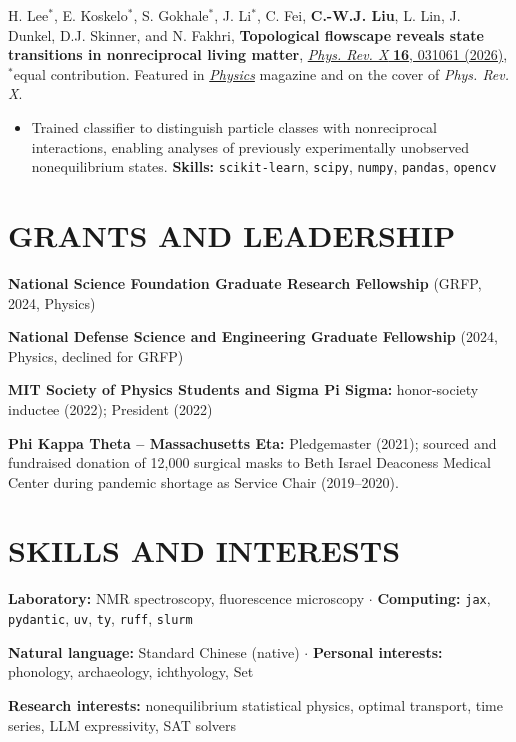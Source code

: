 \documentclass[11pt,letterpaper]{article}
\newcommand{\publication}[1]{#1\par}
\newcommand{\projectsep}{\par\vspace{2pt}}
\begin{document}
\projectsep
\publication{H. Lee$^*$, E. Koskelo$^*$, S. Gokhale$^*$, J. Li$^*$, C. Fei, \textbf{C.-W.J. Liu}, L. Lin, J. Dunkel, D.J. Skinner, and N. Fakhri, \textbf{Topological flowscape reveals state transitions in nonreciprocal living matter}, \href{https://doi.org/10.1103/tq6h-f5ws}{\textit{Phys. Rev. X} \textbf{16}, 031061 (2026)}, $^*$equal contribution. Featured in \href{https://physics.aps.org/articles/v19/115}{\textit{Physics}} magazine and on the cover of \textit{Phys. Rev. X}.}
\begin{itemize}
\item Trained classifier to distinguish particle classes with nonreciprocal interactions, enabling analyses of previously experimentally unobserved nonequilibrium states.
\textbf{Skills:} \texttt{scikit-learn}, \texttt{scipy}, \texttt{numpy}, \texttt{pandas}, \texttt{opencv}
\end{itemize}

\section{GRANTS AND LEADERSHIP}
\begingroup\setlength{\parskip}{1pt}
\textbf{National Science Foundation Graduate Research Fellowship} (GRFP, 2024, Physics)\par
\textbf{National Defense Science and Engineering Graduate Fellowship} (2024, Physics, declined for GRFP)\par
\textbf{MIT Society of Physics Students and Sigma Pi Sigma:} honor-society inductee (2022); President (2022)\par
\textbf{Phi Kappa Theta -- Massachusetts Eta:} Pledgemaster (2021); sourced and fundraised donation of 12,000 surgical masks to Beth Israel Deaconess Medical Center during pandemic shortage as Service Chair (2019--2020).
\par\endgroup

\section{SKILLS AND INTERESTS}
\textbf{Laboratory:} NMR spectroscopy, fluorescence microscopy $\cdot$ \textbf{Computing:} \texttt{jax}, \texttt{pydantic}, \texttt{uv}, \texttt{ty}, \texttt{ruff}, \texttt{slurm}\par
\textbf{Natural language:} Standard Chinese (native) $\cdot$ \textbf{Personal interests:} phonology, archaeology, ichthyology, Set\par
\textbf{Research interests:} nonequilibrium statistical physics, optimal transport, time series, LLM expressivity, SAT solvers\par
\end{document}
